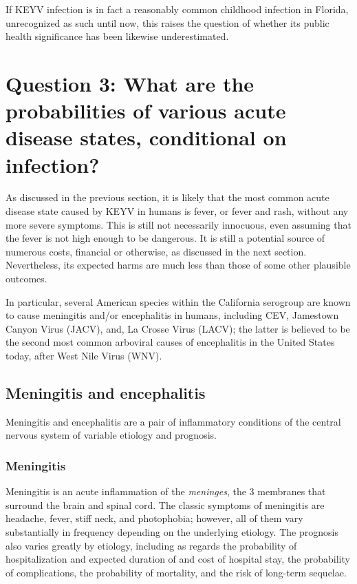 \documentclass[12pt]{article}
\newcommand{\cjh}{\textcolor{blue}{cjh}}
\newcommand{\msg}[3]{(#1 $\rightarrow$ #2: #3)}
\newcommand{\mcc}[1]{\msg\cjh\cjh{#1}}
\begin{document}
            If KEYV infection is in fact a reasonably common childhood infection in Florida, unrecognized as such until now, this raises the question of whether its public health significance has been likewise underestimated.


    \section[Probabilities of disease, given infection]{Question 3: What are the probabilities of various acute disease states, conditional on infection?}
        \label{probabilities}
        As discussed in the previous section, it is likely that the most common acute disease state caused by KEYV in humans is fever, or fever and rash, without any more severe symptoms. This is still not necessarily innocuous, even assuming that the fever is not high enough to be dangerous. It is still a potential source of numerous costs, financial or otherwise, as discussed in the next section. Nevertheless, its expected harms are much less than those of some other plausible outcomes.

        In particular, several American species within the California serogroup are known to cause meningitis and/or encephalitis in humans, including CEV, Jamestown Canyon Virus (JACV), and, La Crosse Virus (LACV); the latter is believed to be the second most common arboviral causes of encephalitis in the United States today, after West Nile Virus (WNV).

        \subsection{Meningitis and encephalitis}
            \label{m-and-e}
            Meningitis and encephalitis are a pair of inflammatory conditions of the central nervous system of variable etiology and prognosis.
            
            \subsubsection{Meningitis}
                \label{meningitis}
            Meningitis is an acute inflammation of the \textit{meninges}, the 3 membranes that surround the brain and spinal cord. The classic symptoms of meningitis are headache, fever, stiff neck, and photophobia; however, all of them vary substantially in frequency depending on the underlying etiology. The prognosis also varies greatly by etiology, including as regards the probability of hospitalization and expected duration of and cost of hospital stay, the probability of complications, the probability of mortality, and the risk of long-term sequelae.
\end{document}
